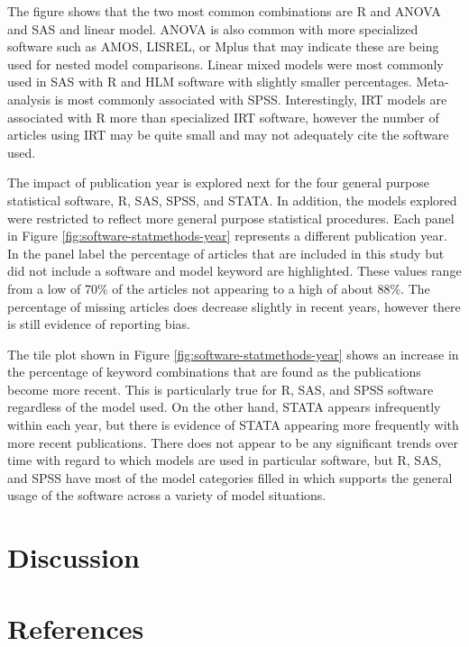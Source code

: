 \documentclass[english,,man]{apa6}
\theoremstyle{definition}
\theoremstyle{definition}
\theoremstyle{definition}
\theoremstyle{remark}
\begin{document}
The figure shows that the two most common combinations are R and ANOVA
and SAS and linear model. ANOVA is also common with more specialized
software such as AMOS, LISREL, or Mplus that may indicate these are
being used for nested model comparisons. Linear mixed models were most
commonly used in SAS with R and HLM software with slightly smaller
percentages. Meta-analysis is most commonly associated with SPSS.
Interestingly, IRT models are associated with R more than specialized
IRT software, however the number of articles using IRT may be quite
small and may not adequately cite the software used.

The impact of publication year is explored next for the four general
purpose statistical software, R, SAS, SPSS, and STATA. In addition, the
models explored were restricted to reflect more general purpose
statistical procedures. Each panel in Figure
\ref{fig:software-statmethods-year} represents a different publication
year. In the panel label the percentage of articles that are included in
this study but did not include a software and model keyword are
highlighted. These values range from a low of 70\% of the articles not
appearing to a high of about 88\%. The percentage of missing articles
does decrease slightly in recent years, however there is still evidence
of reporting bias.

The tile plot shown in Figure \ref{fig:software-statmethods-year} shows
an increase in the percentage of keyword combinations that are found as
the publications become more recent. This is particularly true for R,
SAS, and SPSS software regardless of the model used. On the other hand,
STATA appears infrequently within each year, but there is evidence of
STATA appearing more frequently with more recent publications. There
does not appear to be any significant trends over time with regard to
which models are used in particular software, but R, SAS, and SPSS have
most of the model categories filled in which supports the general usage
of the software across a variety of model situations.

\hypertarget{discussion}{%
\section{Discussion}\label{discussion}}

\newpage

\hypertarget{references}{%
\section{References}\label{references}}
\end{document}
